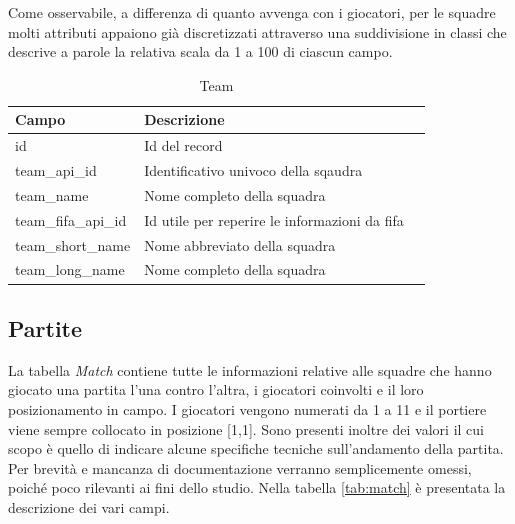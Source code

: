 \documentclass[hidelinks, 12pt]{article}
\begin{document}
Come osservabile, a differenza di quanto avvenga con i giocatori, per le squadre molti attributi appaiono già discretizzati attraverso una suddivisione in classi che descrive a parole la relativa scala da 1 a 100 di ciascun campo.

\begin{table}[H]
	\caption{Team}\label{tab:team}
	\centering
	\begin{tabular}{|l|l|l|}
		\hline
		Campo & Descrizione \\
		\hline
		id & Id del record \\
		team\_api\_id & Identificativo univoco della sqaudra \\
		team\_name & Nome completo della squadra \\
		team\_fifa\_api\_id & Id utile per reperire le informazioni da fifa \\
		team\_short\_name & Nome abbreviato della squadra \\
		team\_long\_name & Nome completo della squadra \\
		\hline
	\end{tabular}
\end{table}



\subsection{Partite}

La tabella {\it Match} contiene tutte le informazioni relative alle squadre che hanno giocato una partita l'una contro l'altra, i giocatori coinvolti e il loro posizionamento in campo. I giocatori vengono numerati da 1 a 11 e il portiere viene sempre collocato in posizione [1,1]. Sono presenti inoltre dei valori il cui scopo è quello di indicare alcune specifiche tecniche sull'andamento della partita. Per brevità e mancanza di documentazione verranno semplicemente omessi, poiché poco rilevanti ai fini dello studio. Nella tabella \ref{tab:match} è presentata la descrizione dei vari campi. 
\end{document}
